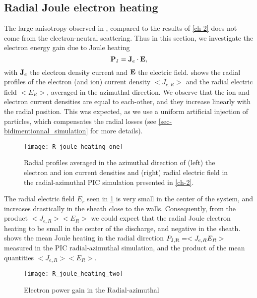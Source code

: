     \subsection{Radial Joule electron heating } \label{subsec-radial-heating}
  
  The large anisotropy observed in , compared to the results of \cref{ch-2} does not come from the electron-neutral scattering.
  Thus in this section, we investigate the electron energy gain due to Joule heating
  \begin{equation} \label{eq-epower}
      {\mathbf P_{\rm J}} = {\mathbf J_e} \cdot {\mathbf E},
  \end{equation}
  with ${\mathbf J_e}$ the electron density current and ${\mathbf E}$ the electric field.
   shows the radial profiles of the electron (and ion) current density $< J_{e, R}>$ and the radial electric field $ < E_R >$, averaged in the azimuthal direction.
  We observe that the ion and electron current densities are equal to each-other, and they increase linearly with the radial position.
  This was expected, as we use a uniform artificial injection of particles, which compensates the radial losses (see \cref{sec-bidimentionnal_simulation} for more details).

  \begin{figure}[hbt]
    \centering
    \texttt{[image: R\_joule\_heating\_one]}
    \caption{Radial profiles averaged in the azimuthal direction of (left) the electron and ion current densities and (right) radial electric field in the radial-azimuthal \acs{PIC} simulation presented in \cref{ch-2}. }
    \label{fig-epower_radialone}
  \end{figure}
  
  The radial electric field $E_r$ seen in \cref{fig-epower_radialone} is very small in the center of the system, and increases drastically in the sheath close to the walls.
  Consequently, from the product $< J_{e, R}>  < E_R >$ we could expect that the radial Joule electron heating to be small in the center of the discharge, and negative in the sheath.
   shows the mean Joule heating in the radial direction ${P_{\rm J, R}} = < J_{e, R} E_R >$ measured in the \ac{PIC} radial-azimuthal simulation, and the product of the mean quantities $< J_{e, R}>  < E_R >$.

  \begin{figure}[hbt]
    \centering
    \texttt{[image: R\_joule\_heating\_two]}
    \caption{Electron power gain in the Radial-azimuthal }
    \label{fig-epower_radial}
  \end{figure}

